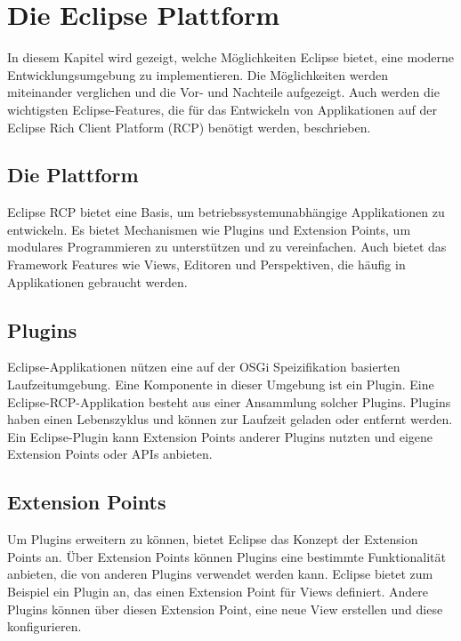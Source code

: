 \chapter{Die Eclipse Plattform}
\label{chap:platform}

In diesem Kapitel wird gezeigt, welche Möglichkeiten Eclipse bietet, eine moderne Entwicklungsumgebung zu implementieren. Die Möglichkeiten werden miteinander verglichen und die Vor- und Nachteile aufgezeigt. Auch werden die wichtigsten Eclipse-Features, die für das Entwickeln von Applikationen auf der Eclipse Rich Client Platform (RCP) benötigt werden, beschrieben.

\section{Die Plattform}

Eclipse RCP bietet eine Basis, um betriebssystemunabhängige Applikationen zu entwickeln. Es bietet Mechanismen wie Plugins und Extension Points, um modulares Programmieren zu unterstützen und zu vereinfachen. Auch bietet das Framework Features wie Views, Editoren und Perspektiven, die häufig in Applikationen gebraucht werden.

\section{Plugins}

Eclipse-Applikationen nützen eine auf der OSGi Speizifikation basierten Laufzeitumgebung. Eine Komponente in dieser Umgebung ist ein Plugin. Eine Eclipse-RCP-Applikation besteht aus einer Ansammlung solcher Plugins.\cite{whatisaplugin} Plugins haben einen Lebenszyklus und können zur Laufzeit geladen oder entfernt werden. Ein Eclipse-Plugin kann Extension Points anderer Plugins nutzten und eigene Extension Points oder APIs anbieten.

\section{Extension Points}
\label{extensionpointssection}

Um Plugins erweitern zu können, bietet Eclipse das Konzept der Extension Points an. Über Extension Points können Plugins eine bestimmte Funktionalität anbieten, die von anderen Plugins verwendet werden kann. 
\newline
Eclipse bietet zum Beispiel ein Plugin an, das einen Extension Point für Views definiert. Andere Plugins können über diesen Extension Point, eine neue View erstellen und diese konfigurieren. \cite{extensionpoints}

